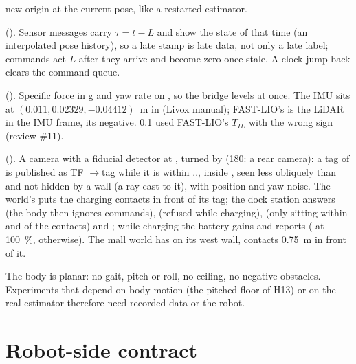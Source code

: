 \begin{description}
    new origin at the current pose, like a restarted estimator.
  \item[Latency] (). Sensor messages carry $\tau = t - L$ and show the state of
    that time (an interpolated pose history), so a late stamp is late data, not only a late
    label; commands act $L$ after they arrive and become zero once stale. A clock jump back
    clears the command queue.
  \item[IMU] (). Specific force in g and yaw rate on , so the
    bridge levels at once. The IMU sits at $(0.011, 0.02329, -0.04412)$~m in 
    (Livox manual); FAST-LIO's  is the LiDAR in the IMU frame, its negative.
    0.1 used FAST-LIO's $T_{IL}$ with the wrong sign (review \#11).
  \item[Tag camera and dock] (). A camera with a fiducial detector at
    , turned by  (180: a rear camera): a tag of
     is published as TF $\to$tag while it is within
    .., inside , seen less obliquely than
     and not hidden by a wall (a ray cast to it), with position and yaw
    noise. The world's  puts the charging contacts  in front of its
    tag; the dock station answers  (the body then ignores commands),
     (refused while charging),  (only sitting within
     and  of the contacts) and ;
    while charging the battery gains  and  reports
     ( at 100~\%,  otherwise).
    The mall world has  on its west wall, contacts 0.75~m in front of it.
\end{description}

The body is planar: no gait, pitch or roll, no ceiling, no negative obstacles. Experiments that
depend on body motion (the pitched floor of H13) or on the real estimator therefore need
recorded data or the robot.

\section{Robot-side contract}

